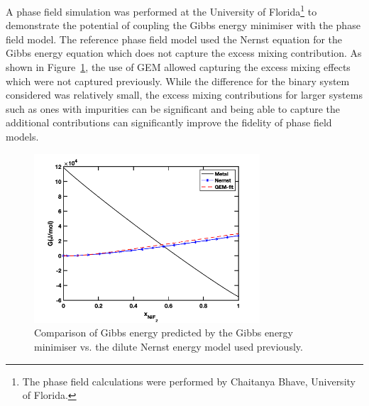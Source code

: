 A phase field simulation was performed at the University of Florida\footnote{The phase field calculations were performed by Chaitanya Bhave, University of Florida.} to demonstrate the potential of coupling the Gibbs energy minimiser with the phase field model. The reference phase field model used the Nernst equation for the Gibbs energy equation which does not capture the excess mixing contribution. As shown in Figure~\ref{fig:pfgibbs}, the use of GEM allowed capturing the excess mixing effects which were not captured previously. While the difference for the binary system considered was relatively small, the excess mixing contributions for larger systems such as ones with impurities can be significant and being able to capture the additional contributions can significantly improve the fidelity of phase field models.
    \begin{figure}[h!]
        \centering
        \includegraphics[width=0.75\textwidth]{figures/chapter-7/gibbs.png}
        \caption{Comparison of Gibbs energy predicted by the Gibbs energy minimiser vs. the dilute Nernst energy model used previously.}
        \label{fig:pfgibbs}
    \end{figure}

